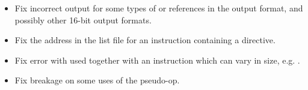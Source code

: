 
\begin{itemize}
    \item{Fix incorrect output for some types of  or 
        references in the  output format, and possibly other 16-bit
        output formats.}

    \item{Fix the address in the list file for an instruction containing a
         directive.}

    \item{Fix error with  used together with an instruction which
        can vary in size, e.g. .}

    \item{Fix breakage on some uses of the  pseudo-op.}
\end{itemize}


